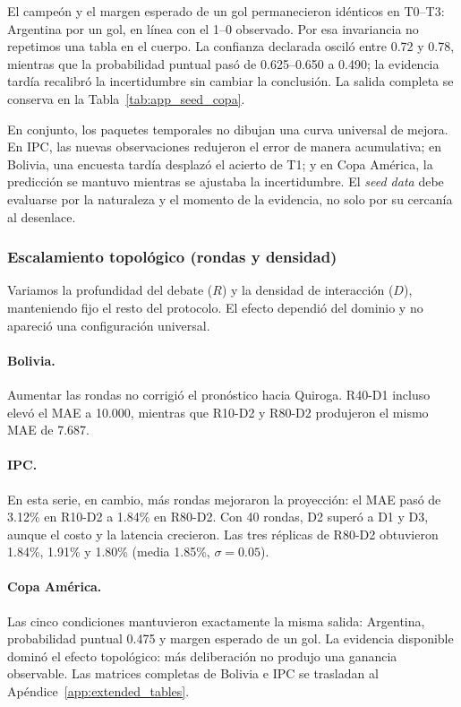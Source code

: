 \documentclass[11pt]{article}
\begin{document}
El campeón y el margen esperado de un gol permanecieron idénticos en T0--T3: Argentina por un gol, en línea con el 1--0 observado. Por esa invariancia no repetimos una tabla en el cuerpo. La confianza declarada osciló entre 0.72 y 0.78, mientras que la probabilidad puntual pasó de 0.625--0.650 a 0.490; la evidencia tardía recalibró la incertidumbre sin cambiar la conclusión. La salida completa se conserva en la Tabla~\ref{tab:app_seed_copa}.

En conjunto, los paquetes temporales no dibujan una curva universal de mejora. En IPC, las nuevas observaciones redujeron el error de manera acumulativa; en Bolivia, una encuesta tardía desplazó el acierto de T1; y en Copa América, la predicción se mantuvo mientras se ajustaba la incertidumbre. El \textit{seed data} debe evaluarse por la naturaleza y el momento de la evidencia, no solo por su cercanía al desenlace.

\subsubsection{Escalamiento topológico (rondas y densidad)}

Variamos la profundidad del debate ($R$) y la densidad de interacción ($D$), manteniendo fijo el resto del protocolo. El efecto dependió del dominio y no apareció una configuración universal.

\paragraph{Bolivia.}
Aumentar las rondas no corrigió el pronóstico hacia Quiroga. R40-D1 incluso elevó el MAE a 10.000, mientras que R10-D2 y R80-D2 produjeron el mismo MAE de 7.687.

\paragraph{IPC.}
En esta serie, en cambio, más rondas mejoraron la proyección: el MAE pasó de 3.12\% en R10-D2 a 1.84\% en R80-D2. Con 40 rondas, D2 superó a D1 y D3, aunque el costo y la latencia crecieron. Las tres réplicas de R80-D2 obtuvieron 1.84\%, 1.91\% y 1.80\% (media 1.85\%, $\sigma=0.05$).

\paragraph{Copa América.}
Las cinco condiciones mantuvieron exactamente la misma salida: Argentina, probabilidad puntual 0.475 y margen esperado de un gol. La evidencia disponible dominó el efecto topológico: más deliberación no produjo una ganancia observable. Las matrices completas de Bolivia e IPC se trasladan al Apéndice~\ref{app:extended_tables}.
\end{document}
